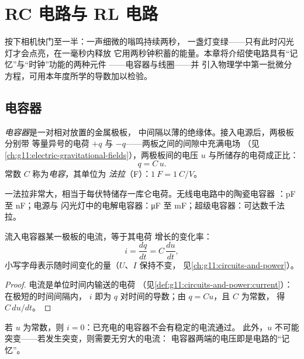 \chapter{RC 电路与 RL 电路}\label{ch:g12:rc-rl-circuits}

按下相机快门至一半：一声细微的嗡鸣持续两秒，
一盏灯变绿——只有此时闪光灯才会点亮，在一毫秒内释放
它用两秒钟积蓄的能量。本章将介绍使电路具有“记忆”与“时钟”功能的两种元件
——电容器与线圈——并
引入物理学中第一批微分方程，可用本年度所学的导数加以检验。

\section{电容器}

\begin{definition}[电容器与电容]\label{def:g12:rc-rl-circuits:capacitor}
\emph{电容器}是一对相对放置的金属极板，
中间隔以薄的绝缘体。接入电源后，两极板分别带
等量异号的电荷 $+q$ 与 $-q$——两板之间的间隙中充满电场
（见\cref{ch:g11:electric-gravitational-fields}），两极板间的电压 $u$
与所储存的电荷成正比：
\[ q = C\,u . \]
常数 $C$ 称为\emph{电容}，其单位为
\emph{法拉}（\unit{F}）：$\qty{1}{F} = \qty{1}{C/V}$。
\end{definition}

\begin{example}[数量级]\label{ex:g12:rc-rl-circuits:orders}
一法拉非常大，相当于每伏特储存一库仑电荷。无线电电路中的陶瓷电容器
：\unit{pF} 至 \unit{nF}；电源与
闪光灯中的电解电容器：\unit{\micro F} 至 \unit{mF}；超级电容器：可达数千法拉。
\end{example}

\begin{proposition}[流入电容器的电流]\label{prop:g12:rc-rl-circuits:cdudt}
流入电容器某一极板的电流，等于其电荷
增长的变化率：
\[
i = \frac{dq}{dt} = C\,\frac{du}{dt} ,
\]
小写字母表示随时间变化的量（$U$、$I$ 保持不变，
见\cref{ch:g11:circuits-and-power}）。
\end{proposition}

\begin{proof}
电流是单位时间内输送的电荷
（见\cref{def:g11:circuits-and-power:current}）：在极短的时间间隔内，
$i$ 即为 $q$ 对时间的导数；由 $q = Cu$，且 $C$ 为常数，
得 $C\,du/dt$。
\end{proof}

\begin{remark}[两个推论]\label{rem:g12:rc-rl-circuits:continuity}
若 $u$ 为常数，则 $i = 0$：已充电的电容器不会有稳定的电流通过。
此外，$u$ 不可能突变——若发生突变，则需要无穷大的电流：
电容器两端的电压即是电路的“记忆”。
\end{remark}

